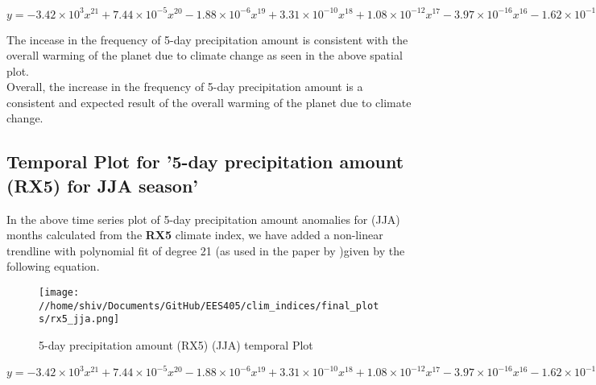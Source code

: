 \documentclass[a4paper, 12pt, twoside]{report}
\begin{document}
$ y = -3.42\times10^{3}x^{21}+7.44\times10^{-5}x^{20}-1.88\times10^{-6}x^{19}+3.31\times10^{-10}x^{18}+1.08\times10^{-12}x^{17}-3.97\times10^{-16}x^{16}-1.62\times10^{-19}x^{15}+1.05\times10^{-22}x^{14}-5.80\times10^{-27}x^{13}-8.00\times10^{-30}x^{12}+2.29\times10^{-33}x^{11}-1.20\times10^{-37}x^{10}-6.72\times10^{-41}x^{9}+1.99\times10^{-44}x^{8}-2.95\times10^{-48}x^{7}+2.85\times10^{-52}x^{6}-1.92\times10^{-56}x^{5}+9.12\times10^{-61}x^{4}-3.03\times10^{-65}x^{3}+6.69\times10^{-70}x^{2}-8.87\times10^{-75}x+5.34\times10^{-80}$

The incease in the frequency of 5-day precipitation amount is consistent with the overall warming of the planet due to climate change as seen in the above spatial plot.\\
Overall, the increase in the frequency of 5-day precipitation amount is a consistent and expected result of the overall warming of the planet due to climate change.


\subsection{Temporal Plot for '5-day precipitation amount (RX5) for JJA season'}
In the above time series plot of 5-day precipitation amount anomalies for (JJA) months calculated from the \textbf{RX5} climate index, we have added a non-linear trendline with polynomial fit of degree 21 (as used in the paper by )given by the following equation.
\begin{figure}[htb]
    \centering
    \texttt{[image: //home/shiv/Documents/GitHub/EES405/clim\_indices/final\_plots/rx5\_jja.png]}
    \caption{5-day precipitation amount (RX5) (JJA) temporal Plot}
    \label{fig:rx5_jja_temporal}
\end{figure}

$ y = -3.42\times10^{3}x^{21}+7.44\times10^{-5}x^{20}-1.88\times10^{-6}x^{19}+3.31\times10^{-10}x^{18}+1.08\times10^{-12}x^{17}-3.97\times10^{-16}x^{16}-1.62\times10^{-19}x^{15}+1.05\times10^{-22}x^{14}-5.80\times10^{-27}x^{13}-8.00\times10^{-30}x^{12}+2.29\times10^{-33}x^{11}-1.20\times10^{-37}x^{10}-6.72\times10^{-41}x^{9}+1.99\times10^{-44}x^{8}-2.95\times10^{-48}x^{7}+2.85\times10^{-52}x^{6}-1.92\times10^{-56}x^{5}+9.12\times10^{-61}x^{4}-3.03\times10^{-65}x^{3}+6.69\times10^{-70}x^{2}-8.87\times10^{-75}x+5.34\times10^{-80}$
\end{document}
